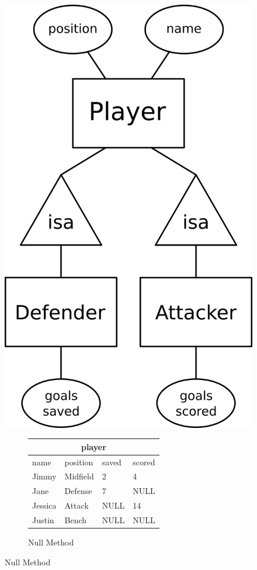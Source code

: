 \documentclass[a4paper]{article}
\begin{document}
\begin{itemize}
\begin{minipage}{0.25\linewidth}
\begin{figure}[H]
\includegraphics[width=\linewidth]{entity15.png}
\end{figure}
\end{minipage}
\hfill
\begin{minipage}{0.7\linewidth}
\begin{figure}[H]
\begin{subfigure}{\linewidth}
\centering
\begin{tabular}{llll}
\multicolumn{4}{c}{player}\\\toprule
name&position&saved&scored\\\midrule
Jimmy&Midfield&2&4\\
Jane&Defense&7&NULL\\
Jessica&Attack&NULL&14\\
Justin&Bench&NULL&NULL\\\bottomrule
\end{tabular}
\caption*{Null Method}
\end{subfigure}


\end{figure}
\end{minipage}
\end{itemize}
\end{document}
